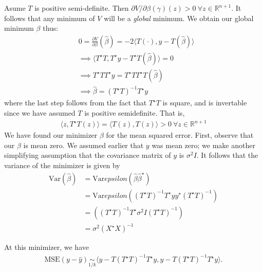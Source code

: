 Asume $T$ is positive semi-definite. Then $\partial V/ \partial \beta(\gamma)(z) > 0
\ \forall z \in \mathbb{R}^{n+1}$. It follows that any minimum of $V$ will be a
\emph{global} minimum. We obtain our global minimum $\beta$ thus:
\begin{equation*}
	\begin{split}
		& 0 = \frac{\partial V}{\partial \beta}(\hat{\beta}) = -2 \langle T(\cdot), y - T(\hat{\beta}) \rangle 
		\\
		& \implies  \langle T^{\star}T, T^{\star}y - T^{\star}T(\hat{\beta}) \rangle  = 0
		\\
		& \implies T^{\star}T T^{\star} y = T^{\star} T T^{\star} T(\hat{\beta})
		\\
		& \implies \hat{\beta} = (T^{\star}T)^{-1} T^{\star} y 
	\end{split}
\end{equation*}
where the last step follows from the fact that $T^{\star}T$ is
square, and is invertable since we have assumed $T$ is positive semidefinite.
That is,
\begin{equation*}
	\begin{split}
		\langle z, T^{\star}T(z) \rangle = \langle T(z), T(z) \rangle > 0 \ \forall
		z \in \mathbb{R}^{n+1}  
	\end{split}
\end{equation*}
We have found our minimizer $\beta$ for the mean squared error. First,
observe that our $\beta$ is mean zero. We assumed earlier that $y$ was
mean zero; we make another simplifying assumption that the covariance matrix of
$y$ is $\sigma^{2}I$. It follows that the variance of the minimizer is given by
\begin{equation*}
	\begin{split}
		\mathrm{Var}(\hat{\beta}) & = \mathrm{Var}epsilon (\hat{\beta} \hat{\beta}^{\star})
		\\
		& = \mathrm{Var}epsilon \left( (T^{\star}T)^{-1}T^{\star}y y^{\star}(T^{\star}T)^{-1} \right)
		\\
		& = \left( (T^{\star}T)^{-1}T^{\star}\sigma^{2}I(T^{\star}T)^{-1} \right)
		\\
		& = \sigma^{2} (X^{\star}X)^{-1}
	\end{split}
\end{equation*}

At this minimizer, we have
\begin{equation*}
	\begin{split}
		\mathrm{MSE}(y - \hat{y}) \underset{1/k}{\sim} \langle y - T(T^{\star}T)^{-1} T^{\star}y, y -
		T(T^{\star}T)^{-1} T^{\star}y \rangle.
	\end{split}
\end{equation*}

